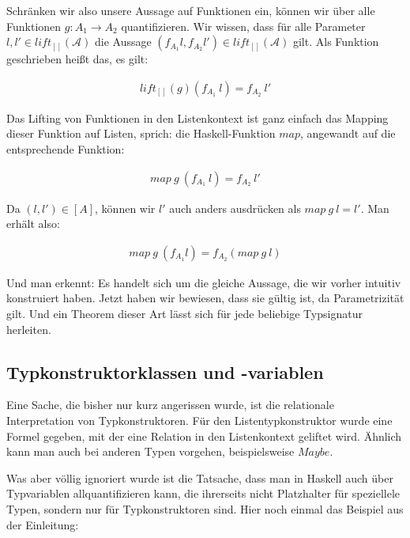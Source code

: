 Schränken wir also unsere Aussage auf Funktionen ein, können wir über alle Funktionen $g : A_1 \rightarrow A_2$ quantifizieren.
Wir wissen, dass für alle Parameter $l, l' \in lift_{[]}(\mathcal{A})$ die Aussage $(f_{A_1} l, f_{A_2} l') \in lift_{[]}(\mathcal{A})$
gilt. Als Funktion geschrieben heißt das, es gilt:

\begin{align}
lift_{[]}(g) (f_{A_1}\ l) = f_{A_2}\ l'
\end{align}

Das Lifting von Funktionen in den Listenkontext ist ganz einfach das Mapping dieser Funktion auf Listen, sprich: die Haskell-Funktion
$map$, angewandt auf die entsprechende Funktion:

\begin{align}
map\ g\ (f_{A_1}\ l) = f_{A_2}\ l'
\end{align}

Da $(l, l') \in [A]$, können wir $l'$ auch anders ausdrücken als $map\ g\ l = l'$. Man erhält also:

\begin{align}
map\ g\ (f_{A_1} l) = f_{A_2} (map\ g\ l)
\end{align}

Und man erkennt: Es handelt sich um die gleiche Aussage, die wir vorher intuitiv konstruiert haben. Jetzt haben wir bewiesen,
dass sie gültig ist, da Parametrizität gilt. Und ein Theorem dieser Art lässt sich für jede beliebige Typsignatur herleiten.


\subsection{Typkonstruktorklassen und -variablen}

\label{sec:typkonstruktorklassen}

Eine Sache, die bisher nur kurz angerissen wurde, ist die relationale Interpretation von Typkonstruktoren.
Für den Listentypkonstruktor wurde eine Formel gegeben, mit der eine Relation in den Listenkontext geliftet wird.
Ähnlich kann man auch bei anderen Typen vorgehen, beispielsweise $Maybe$.

Was aber völlig ignoriert wurde ist die Tatsache, dass man in Haskell auch über Typvariablen allquantifizieren kann, die ihrerseits
nicht Platzhalter für speziellele Typen, sondern nur für Typkonstruktoren sind. Hier noch einmal das Beispiel aus der Einleitung:

